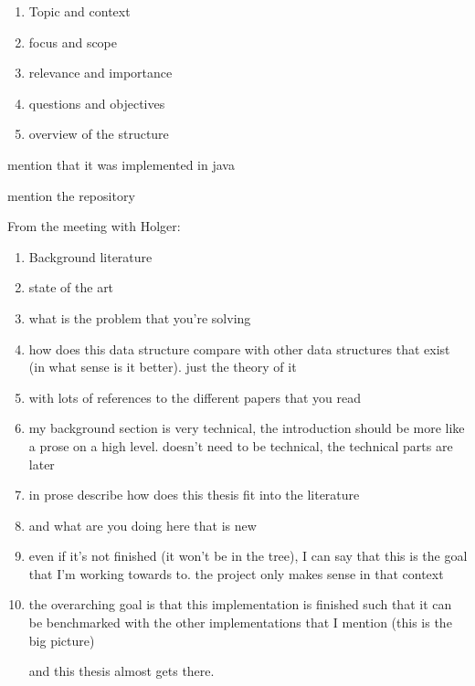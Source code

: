 
\begin{enumerate}
    \item
    Topic and context
    \item
    focus and scope
    \item
    relevance and importance
    \item
    questions and objectives
    \item
    overview of the structure
\end{enumerate}

mention that it was implemented in java

mention the repository

From the meeting with Holger:
\begin{enumerate}
    \item
    Background literature
    
    \item
    state of the art
    
    \item
    what is the problem that you're solving
    
    \item
    how does this data structure compare with other data structures that exist (in what sense is it better). just the theory of it
    
    \item
    with lots of references to the different papers that you read
    
    \item
    my background section is very technical, the introduction should be more like a prose on a high level. doesn't need to be technical, the technical parts are later
    
    \item
    in prose describe how does this thesis fit into the literature
    
    \item
    and what are you doing here that is new
    
    \item
    even if it's not finished (it won't be in the tree), I can say that this is the goal that I'm working towards to. the project only makes sense in that context
    
    \item
    the overarching goal is that this implementation is finished such that it can be benchmarked with the other implementations that I mention (this is the big picture)
    
    and this thesis almost gets there.
\end{enumerate}
